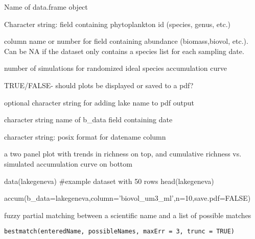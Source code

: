 \documentclass[a4paper]{book}
\begin{document}
\begin{Arguments}
\begin{ldescription}
\item[\code{b\_data}] Name of data.frame object

\item[\code{phyto\_name}] Character string: field containing phytoplankton id (species, genus, etc.)

\item[\code{column}] column name or number for field containing abundance (biomass,biovol, etc.).
Can be NA if the dataset only contains a species list for each sampling date.

\item[\code{n}] number of simulations for randomized ideal species accumulation curve

\item[\code{save.pdf}] TRUE/FALSE- should plots be displayed or saved to a pdf?

\item[\code{lakename}] optional character string for adding lake name to pdf output

\item[\code{datename}] character string name of b\_data field containing date

\item[\code{dateformat}] character string: posix format for datename column
\end{ldescription}
\end{Arguments}
%
\begin{Value}
a two panel plot with trends in richness on top, and cumulative richness vs. simulated
accumulation curve on bottom
\end{Value}
%
\begin{Examples}
\begin{ExampleCode}
data(lakegeneva)
#example dataset with 50 rows
head(lakegeneva)

accum(b_data=lakegeneva,column='biovol_um3_ml',n=10,save.pdf=FALSE)
\end{ExampleCode}
\end{Examples}
%
\begin{Description}\relax
fuzzy partial matching between a scientific name and a list of possible matches
\end{Description}
%
\begin{Usage}
\begin{verbatim}
bestmatch(enteredName, possibleNames, maxErr = 3, trunc = TRUE)
\end{verbatim}
\end{Usage}
\end{document}
